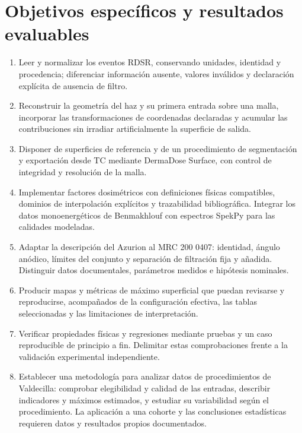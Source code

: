 \section{Objetivos específicos y resultados evaluables}
\begin{enumerate}[leftmargin=*]
\item Leer y normalizar los eventos RDSR, conservando unidades, identidad y procedencia; diferenciar información ausente, valores inválidos y declaración explícita de ausencia de filtro.
\item Reconstruir la geometría del haz y su primera entrada sobre una malla, incorporar las transformaciones de coordenadas declaradas y acumular las contribuciones sin irradiar artificialmente la superficie de salida.
\item Disponer de superficies de referencia y de un procedimiento de segmentación y exportación desde TC mediante DermaDose Surface, con control de integridad y resolución de la malla.
\item Implementar factores dosimétricos con definiciones físicas compatibles, dominios de interpolación explícitos y trazabilidad bibliográfica. Integrar los datos monoenergéticos de Benmakhlouf con espectros SpekPy para las calidades modeladas.
\item Adaptar la descripción del Azurion al MRC 200 0407: identidad, ángulo anódico, límites del conjunto y separación de filtración fija y añadida. Distinguir datos documentales, parámetros medidos e hipótesis nominales.
\item Producir mapas y métricas de máximo superficial que puedan revisarse y reproducirse, acompañados de la configuración efectiva, las tablas seleccionadas y las limitaciones de interpretación.
\item Verificar propiedades físicas y regresiones mediante pruebas y un caso reproducible de principio a fin. Delimitar estas comprobaciones frente a la validación experimental independiente.
\item Establecer una metodología para analizar datos de procedimientos de Valdecilla: comprobar elegibilidad y calidad de las entradas, describir indicadores y máximos estimados, y estudiar su variabilidad según el procedimiento. La aplicación a una cohorte y las conclusiones estadísticas requieren datos y resultados propios documentados.
\end{enumerate}


